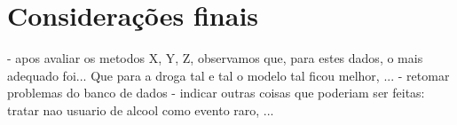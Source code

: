 \documentclass[
	article,			%
	11pt,				%
	oneside,			%
	a4paper,			%
	english,			%
	brazil,				%
	sumario=tradicional
	]{abntex2}
\begin{document}
\section*{Considerações finais}

- apos avaliar os metodos X, Y, Z, observamos que, para estes dados, o mais adequado foi... Que para a droga tal e tal o modelo tal ficou melhor, ... 
- retomar problemas do banco de dados
- indicar outras coisas que poderiam ser feitas: tratar nao usuario de alcool como evento raro, ...


\lipsum[8]

\begin{citacao}
\lipsum[9]
\end{citacao}

\lipsum[10]



%
%

%
%
%

%
%
\end{document}
